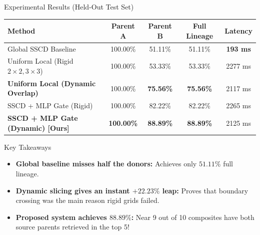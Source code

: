 \documentclass[xcolor=table]{beamer}
\begin{document}
\begin{frame}{Experimental Results (Held-Out Test Set)}
  \begin{center}
  \renewcommand{\arraystretch}{1.25}
  \footnotesize
  \begin{tabular}{|l|c|c|c|c|}
    \hline
    \textbf{Method} & \textbf{Parent A} & \textbf{Parent B} & \textbf{Full Lineage} & \textbf{Latency} \\ \hline \hline
    Global SSCD Baseline & 100.00\% & 51.11\% & 51.11\% & \textbf{193 ms} \\ \hline
    Uniform Local (Rigid $2\times2, 3\times3$) & 100.00\% & 53.33\% & 53.33\% & 2277 ms \\ \hline
    \textbf{Uniform Local (Dynamic Overlap)} & 100.00\% & \textbf{75.56\%} & \textbf{75.56\%} & 2117 ms \\ \hline
    SSCD + MLP Gate (Rigid) & 100.00\% & 82.22\% & 82.22\% & 2265 ms \\ \hline
    \rowcolor{green!15}
    \textbf{SSCD + MLP Gate (Dynamic) [Ours]} & \textbf{100.00\%} & \textbf{88.89\%} & \textbf{88.89\%} & 2125 ms \\ \hline
  \end{tabular}
  \end{center}
  \vspace{0.15cm}
  \begin{block}{Key Takeaways}
    \begin{itemize}
      \item \textbf{Global baseline misses half the donors:} Achieves only $51.11\%$ full lineage.
      \item \textbf{Dynamic slicing gives an instant $+22.23\%$ leap:} Proves that boundary crossing was the main reason rigid grids failed.
      \item \textbf{Proposed system achieves $88.89\%$:} Near 9 out of 10 composites have both source parents retrieved in the top 5!
    \end{itemize}
  \end{block}
\end{frame}
\end{document}
